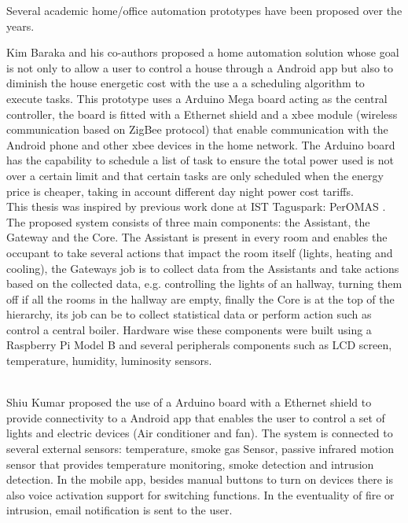 Several academic home/office automation prototypes have been proposed over the years.

Kim Baraka and his co-authors proposed a home automation solution whose goal is not only to allow a user to control a house through a Android app but also to diminish the house energetic cost with the use a a scheduling algorithm \cite{academic:arduino1} to execute tasks. This prototype uses a Arduino Mega board acting as the central controller, the board is fitted with a Ethernet shield and a xbee module (wireless communication based on ZigBee protocol) that enable communication with the Android phone and other xbee devices in the home network. The Arduino board has the capability to schedule a list of task to ensure the total power used is not over a certain limit and that certain tasks are only scheduled when the energy price is cheaper, taking in account different day night power cost tariffs.
\mbox{}\\

This thesis was inspired by previous work done at IST Taguspark: \ac{PerOMAS} \cite{peromas}. The proposed system consists of three main components: the Assistant, the Gateway and the Core.  The Assistant is present in every room and enables the occupant to take several actions that impact the room itself (lights, heating and cooling), the Gateways job is to collect data from the Assistants and take actions based on the collected data, e.g. controlling the lights of an hallway, turning them off if all the rooms in the hallway are empty, finally the Core is at the top of the hierarchy, its job can be to collect statistical data or perform action such as control a central boiler. 
Hardware wise these components were built using a Raspberry Pi Model B and several peripherals components such as LCD screen, temperature, humidity, luminosity sensors.

\mbox{}\\
Shiu Kumar proposed the use of a Arduino board with a Ethernet shield to provide connectivity to a Android app that enables the user to control a set of lights and electric devices (Air conditioner and fan)\cite{academic3}. The system is connected to several external sensors: temperature, smoke gas Sensor, passive infrared motion sensor that provides temperature monitoring, smoke detection and intrusion detection.
In the mobile app, besides manual buttons to turn on devices there is also voice activation support for switching functions. In the eventuality of fire or intrusion, email notification is sent to the user.


